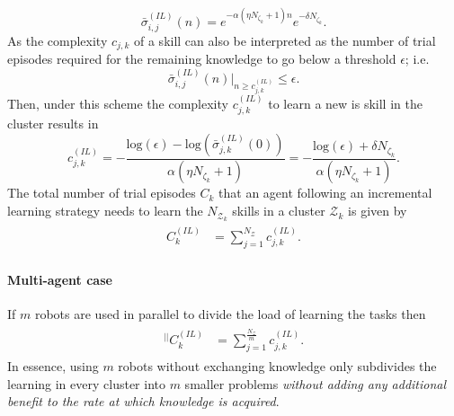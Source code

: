 \begin{equation*}\label{eq:remaining_knowledge__IL}
	\bar{\sigma}^{(IL)}_{i,j}(n) = e^{-\alpha  \left(\eta N_{\zeta_k}+1\right) n} e^{-\delta N_{\zeta_k}}.
\end{equation*}
As the complexity $c_{j,k}$ of a skill can also be interpreted as the number of trial episodes required for the remaining knowledge to go below a threshold $\epsilon$; i.e.
\begin{equation*}
	\bar{\sigma}^{(IL)}_{i,j}(n) \Big \rvert_{n \ge c^{(IL)}_{j,k}} \leq \epsilon.
\end{equation*}
Then, under this scheme the complexity $c^{(IL)}_{j,k}$ to learn a new is skill in the cluster results in
\begin{equation}\label{eq:complexity_IL}
	c^{(IL)}_{j,k} = -\frac{\text{log}(\epsilon) - \text{log}\left(\bar{\sigma}^{(IL)}_{j,k}(0)\right)}{\alpha (\eta N_{\zeta_k}+ 1)} = -\frac{\text{log}(\epsilon) + \delta N_{\zeta_k}}{\alpha (\eta N_{\zeta_k}+ 1)}  .
\end{equation}
The total number of trial episodes $ C_k $ that an agent following an incremental learning strategy needs to learn the $N_{\mathcal{Z}_k}$ skills in a cluster $ \mathcal{Z}_k $ is given by
\begin{align}\label{eq:total_episodes_incremental}
	\begin{split}
		C^{(IL)}_k &= \sum^{N_{\mathcal{Z}}}_{j=1} c^{(IL)}_{j,k}.
	\end{split}
\end{align}

\paragraph*{Multi-agent case}
If $m$ robots are used in parallel to divide the load of learning the tasks then
\begin{align}
	\begin{split}
		{}^{\lvert \rvert}C^{(IL)}_k &= \sum^{\frac{N_{\mathcal{Z}}}{m}}_{j=1} c^{(IL)}_{j,k}.
	\end{split}
\end{align}
In essence, using $m$ robots without exchanging knowledge only subdivides the learning in every cluster into $m$ smaller problems \emph{without adding any additional benefit to the rate at which knowledge is acquired}. 

